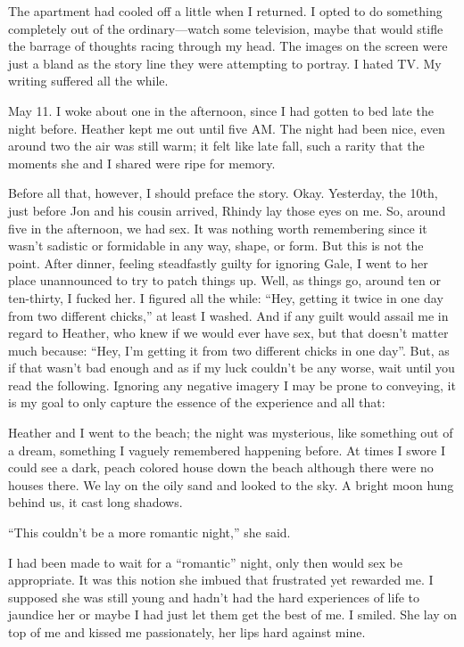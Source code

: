 The apartment had cooled off a little when I returned. I opted to do
something completely out of the ordinary---watch some television, maybe
that would stifle the barrage of thoughts racing through my head. The
images on the screen were just a bland as the story line they were
attempting to portray. I hated TV. My writing suffered all the while.

May 11. I woke about one in the afternoon, since I had gotten to bed
late the night before. Heather kept me out until five AM. The night had
been nice, even around two the air was still warm; it felt like late
fall, such a rarity that the moments she and I shared were ripe for
memory.

Before all that, however, I should preface the story. Okay. Yesterday,
the 10th, just before Jon and his cousin arrived, Rhindy lay those eyes
on me. So, around five in the afternoon, we had sex. It was nothing
worth remembering since it wasn't sadistic or formidable in any way,
shape, or form. But this is not the point. After dinner, feeling
steadfastly guilty for ignoring Gale, I went to her place unannounced to
try to patch things up. Well, as things go, around ten or ten-thirty, I
fucked her. I figured all the while: ``Hey, getting it twice in one day
from two different chicks,'' at least I washed. And if any guilt would
assail me in regard to Heather, who knew if we would ever have sex, but
that doesn't matter much because: ``Hey, I'm getting it from two
different chicks in one day''. But, as if that wasn't bad enough and as
if my luck couldn't be any worse, wait until you read the following.
Ignoring any negative imagery I may be prone to conveying, it is my goal
to only capture the essence of the experience and all that:

Heather and I went to the beach; the night was mysterious, like
something out of a dream, something I vaguely remembered happening
before. At times I swore I could see a dark, peach colored house down
the beach although there were no houses there. We lay on the oily sand
and looked to the sky. A bright moon hung behind us, it cast long
shadows.

``This couldn't be a more romantic night,'' she said.

I had been made to wait for a ``romantic'' night, only then would sex be
appropriate. It was this notion she imbued that frustrated yet rewarded
me. I supposed she was still young and hadn't had the hard experiences
of life to jaundice her or maybe I had just let them get the best of me.
I smiled. She lay on top of me and kissed me passionately, her lips hard
against mine.

